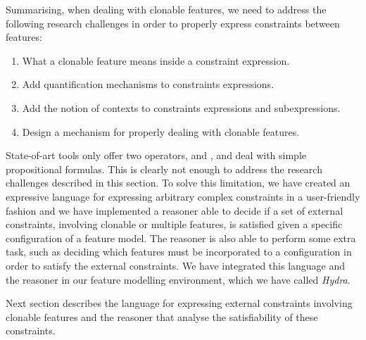 Summarising, when dealing with clonable features, we need to address the following research challenges in order to properly express constraints between features:

\begin{enumerate}
    \item What a clonable feature means inside a constraint expression.
    \item Add quantification mechanisms to constraints expressions.
    \item Add the notion of contexts to constraints expressions and subexpressions.
    \item Design a mechanism for properly dealing with clonable features.
\end{enumerate}

State-of-art tools only offer two operators,  and , and deal with simple propositional formulas. This is clearly not enough to address the research challenges described in this section.
To solve this limitation, we have created an expressive language for expressing arbitrary complex constraints in a user-friendly fashion and we have implemented a reasoner able to decide if a set of external constraints, involving
clonable or multiple features, is satisfied given a specific configuration of a feature model. The reasoner is also able to perform some extra task, such as deciding which features must be incorporated to a configuration in order to satisfy the external constraints. We have integrated this language and the reasoner in our feature modelling environment, which we have called \emph{Hydra}.

Next section describes the language for expressing external constraints involving clonable features and the reasoner that analyse the satisfiability of these constraints.



